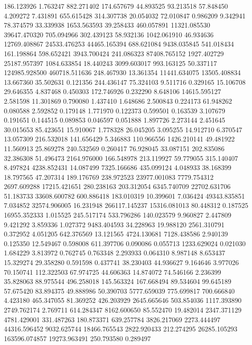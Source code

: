 186.123926
1.763247
882.271402
174.657679
44.893525
93.213518
57.848450
4.209272
7.431891
655.615428
314.307738
20.054032
72.010847
0.986209
9.342941
78.374579
33.339938
1653.563593
39.258433
460.057891
11321.085530
39647.470320
705.094966
302.439123
58.932136
1042.061910
46.934636
12769.408867
24533.476253
44465.165394
688.621084
9438.035845
541.018434
161.198864
598.652421
3943.700424
241.086323
87408.765152
1927.402729
25187.957397
1084.633854
18.440243
3099.603017
993.163125
50.337117
124985.928500
460718.511636
248.467930
13.361354
11441.634075
13505.408834
13.667360
35.502631
0.121356
244.436147
75.324103
9.511716
0.329165
15.106708
29.646355
4.837468
0.450303
172.746926
0.232290
8.648106
14615.595127
2.581598
11.301869
0.790080
1.437410
1.648686
2.500843
0.224173
61.948262
0.080588
2.592852
0.179148
1.771970
0.122373
0.599501
0.163539
3.107679
0.191651
0.144515
0.089853
0.046597
0.051888
1.897726
2.273144
2.451645
30.015653
85.423651
15.910067
1.778328
26.045205
3.095255
14.912710
6.370547
13.057309
216.532018
141.656429
5.346883
110.966556
1426.210141
49.481922
11.560913
25.869278
240.532569
0.260417
76.928045
33.087151
202.835086
32.386308
51.496473
2164.976000
166.548978
213.119927
59.779055
315.140407
8.497824
4238.852431
14.087499
7325.166686
435.099124
4.048933
38.168399
18.797565
47.207314
189.176769
238.972523
23977.001083
7779.754312
2697.609288
17215.421651
280.238163
203.312054
6345.740709
22702.631706
51.183733
33608.600782
600.886418
183.010319
10.399601
7.036424
49343.835851
7.034852
32574.906005
16.231948
266117.145237
15316.081013
80.448312
0.187525
16955.352333
1.015525
245.517174
533.796286
140.023579
9.960827
2.447809
9.421292
3.859336
1.027372
9483.404593
34.228963
19.988120
2561.310791
0.372952
4.051205
642.376569
13.121565
4724.130681
7128.438586
2.940139
0.125350
12.549467
0.598008
611.397706
0.090086
0.055713
1233.629024
0.021030
1.684229
3.813972
0.762745
0.763348
2.293933
0.064310
8.987148
8.653437
15.329274
29.358280
0.591598
0.437741
38.230403
44.936627
9.164646
3.977026
70.150741
112.322503
67.974725
44.606363
14.874072
74.546166
2.236399
35.828063
88.975544
496.258018
145.563324
167.668494
89.534604
99.645189
57.675420
83.894375
49.888986
50.390703
5777.659039
775.699817
700.666840
4.423180
465.347055
81.369252
426.203929
2645.665646
503.854036
1117.393890
2749.762174
2.769711
614.284347
8162.600650
85.552470
19.482014
2347.371129
4781.429001
331.487263
180.873371
639.257784
3826.217069
2273.444497
44316.596452
9032.625744
18466.765543
2822.920433
212.274295
26285.105293
163596.074857
19273.963491
250.793580
0.289497
